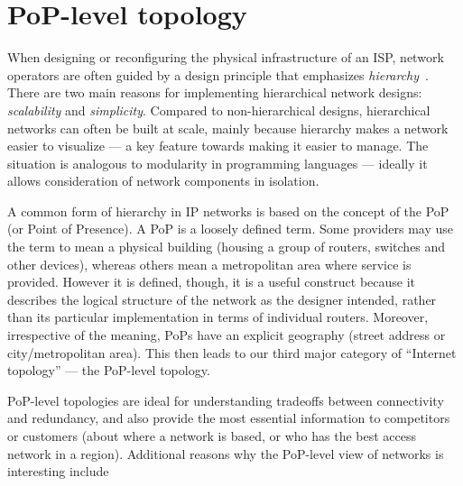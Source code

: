 \section{PoP-level topology}


When designing or reconfiguring the physical infrastructure of an ISP, network 
operators are often guided by a design principle that emphasizes 
{\em hierarchy}~\cite{Cisco05,Gill,Morris07}.  There are two main reasons 
for implementing hierarchical network designs: {\em scalability} and {\em simplicity}.  
Compared to non-hierarchical designs, hierarchical networks can often be built at scale, 
mainly because hierarchy makes a network easier to visualize --- a key feature towards 
making it easier to manage. The situation is analogous to modularity in programming 
languages --- ideally it allows consideration of network components in isolation.

A common form of hierarchy in IP networks is based on the concept of the PoP (or 
Point of Presence). A PoP is a loosely defined term. Some providers may use the 
term to mean a physical building (housing a group of routers, switches and other 
devices), whereas others mean a metropolitan area where service is provided. 
However it is defined, though, it is a useful construct because it describes 
the logical structure of the network as the designer intended, rather than its 
particular implementation in terms of individual routers. Moreover, irrespective 
of the meaning, PoPs have an explicit geography (\eg street address or 
city/metropolitan area).  This then leads to our third major category 
of ``Internet topology'' --- the PoP-level topology.

PoP-level topologies are ideal for understanding tradeoffs between connectivity 
and redundancy, and also provide the most essential information to competitors 
or customers (about where a network is based, or who has the best access network 
in a region).  Additional reasons why the PoP-level view of networks is interesting 
include

